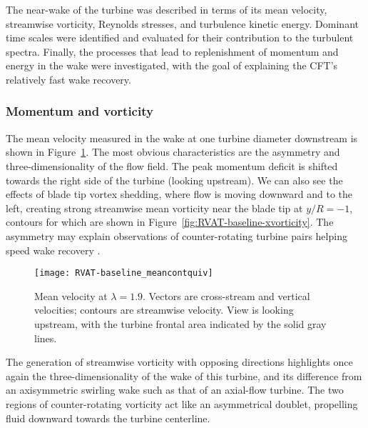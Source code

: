 The near-wake of the turbine was described in terms of its mean velocity,
streamwise vorticity, Reynolds stresses, and turbulence kinetic energy. Dominant
time scales were identified and evaluated for their contribution to the turbulent
spectra. Finally, the processes that lead to replenishment of momentum and
energy in the wake were investigated, with the goal of explaining the CFT's
relatively fast wake recovery.


\subsubsection{Momentum and vorticity}

The mean velocity measured in the wake at one turbine diameter downstream is
shown in Figure~\ref{fig:RVAT-baseline-meancontquiv}. The most obvious
characteristics are the asymmetry and three-dimensionality of the flow field.
The peak momentum deficit is shifted towards the right side of the turbine
(looking upstream). We can also see the effects of blade tip vortex shedding,
where flow is moving downward and to the left, creating strong streamwise mean
vorticity near the blade tip at $y/R=-1$, contours for which are shown in
Figure~\ref{fig:RVAT-baseline-xvorticity}. The asymmetry may explain
observations of counter-rotating turbine pairs helping speed wake recovery
\cite{Dabiri2011}.

\begin{figure}
    \centering

    \texttt{[image: RVAT-baseline\_meancontquiv]}

    \caption{Mean velocity at $\lambda=1.9$. Vectors are cross-stream and
        vertical velocities; contours are streamwise velocity. View is looking
        upstream, with the turbine frontal area indicated by the solid gray lines.}

    \label{fig:RVAT-baseline-meancontquiv}
\end{figure}

The generation of streamwise vorticity with opposing directions highlights once
again the three-dimensionality of the wake of this turbine, and its difference
from an axisymmetric swirling wake such as that of an axial-flow turbine. The
two regions of counter-rotating vorticity act like an asymmetrical doublet,
propelling fluid downward towards the turbine centerline.

